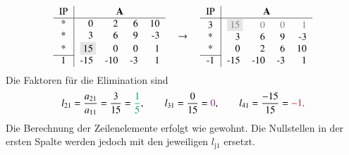 \documentclass[10pt,a4paper]{article}
\begin{document}
    \begin{align*}
        \begin{tabular}{c|rrrr}
        	IP &     \multicolumn{4}{c}{\textbf{A}}     \\ \hline
        	*  &                      0 &   2 &  6 & 10 \\
        	*  &                      3 &   6 &  9 & -3 \\
        	*  & \colorbox{gray!20}{15}\hspace{-0.1cm} &   0 &  0 &  1 \\ \cline{1-1}
        	1  &                    -15 & -10 & -3 &  1
        \end{tabular}
	        \quad \rightarrow \quad
        \begin{tabular}{c|rrrr}
        	IP &                                       \multicolumn{4}{c}{\textbf{A}}                                       \\ \hline
        	3  & \colorbox{gray!20}{\textcolor{gray}{15}}\hspace{-0.1cm} & \textcolor{gray}{0} & \textcolor{gray}{0} & \textcolor{gray}{1} \\
        	*  &                                        3 &                   6 &                   9 &                  -3 \\
        	*  &                                        0 &                   2 &                   6 &                  10 \\ \cline{1-1}
        	-1 &                                      -15 &                 -10 &                  -3 &                   1
        \end{tabular}
    \end{align*}
    Die Faktoren für die Elimination sind
    \begin{align*}
	    l_{21} = \frac{a_{21}}{a_{11}} = \frac{3}{15} = \textcolor{Green}{\frac{1}{5}}, \qquad l_{31}=\frac{0}{15}=\textcolor{Fuchsia}{0}, \qquad l_{41}=\frac{-15}{15}=\textcolor{BrickRed}{-1}.
    \end{align*}
    Die Berechnung der Zeilenelemente erfolgt wie gewohnt. Die Nullstellen in der ersten Spalte werden jedoch mit den jeweiligen $l_{\text{j}1}$ ersetzt.
    
\end{document}
